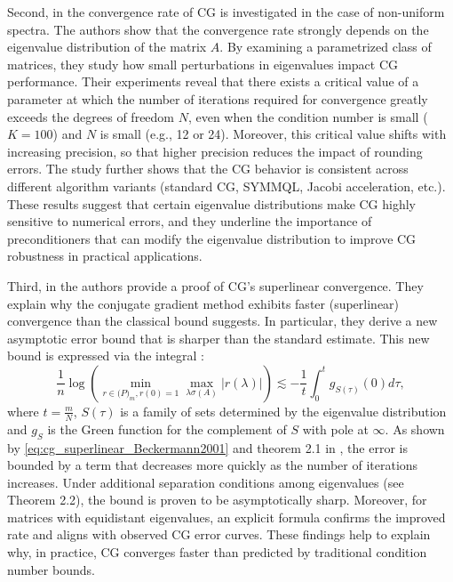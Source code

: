 Second, in \cite{cg_convrate_Strakos1991} the convergence rate of CG is investigated in the case of non-uniform spectra. The authors show that the convergence rate strongly depends on the eigenvalue distribution of the matrix \(A\). By examining a parametrized class of matrices, they study how small perturbations in eigenvalues impact CG performance. Their experiments reveal that there exists a critical value of a parameter at which the number of iterations required for convergence greatly exceeds the degrees of freedom \(N\), even when the condition number is small (\(K=100\)) and \(N\) is small (e.g., 12 or 24). Moreover, this critical value shifts with increasing precision, so that higher precision reduces the impact of rounding errors. The study further shows that the CG behavior is consistent across different algorithm variants (standard CG, SYMMQL, Jacobi acceleration, etc.). These results suggest that certain eigenvalue distributions make CG highly sensitive to numerical errors, and they underline the importance of preconditioners that can modify the eigenvalue distribution to improve CG robustness in practical applications.

Third, in \cite{cg_superlinear_Beckermann2001} the authors provide a proof of CG's superlinear convergence. They explain why the conjugate gradient method exhibits faster (superlinear) convergence than the classical bound suggests. In particular, they derive a new asymptotic error bound that is sharper than the standard estimate. This new bound is expressed via the integral \cite[Equation 1.8]{cg_superlinear_Beckermann2001}:
\begin{equation}
    \frac{1}{n} \log \left(\min_{r\in\mathcal(P)_m, r(0)=1}\max_{\lambda \sigma(A)}|r(\lambda)|\right) \lesssim-\frac{1}{t} \int_0^t g_{S(\tau)}(0) d \tau,
    \label{eq:cg_superlinear_Beckermann2001}
\end{equation}
where $t = \frac{m}{N}$, $S(\tau)$ is a family of sets determined by the eigenvalue distribution and $g_S$ is the Green function for the complement of $S$ with pole at $\infty$. As shown by \cref{eq:cg_superlinear_Beckermann2001} and theorem 2.1 in \cite{cg_sharp_bound_Beckermann2001}, the error is bounded by a term that decreases more quickly as the number of iterations increases. Under additional separation conditions among eigenvalues (see Theorem 2.2), the bound is proven to be asymptotically sharp. Moreover, for matrices with equidistant eigenvalues, an explicit formula \cite[Corollary 3.2 and Equation 3.11]{cg_superlinear_Beckermann2001} confirms the improved rate and aligns with observed CG error curves. These findings help to explain why, in practice, CG converges faster than predicted by traditional condition number bounds.


